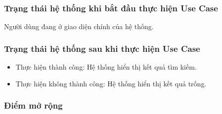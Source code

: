 \subsubsection{Trạng thái hệ thống khi bắt đầu thực hiện Use Case}
Người dùng đang ở giao diện chính của hệ thống.

\subsubsection{Trạng thái hệ thống sau khi thực hiện Use Case}
\begin{itemize}
  \item Thực hiện thành công: Hệ thống hiển thị kết quả tìm kiếm.
  \item Thực hiện không thành công: Hệ thống hiển thị kết quả trống.
\end{itemize}

\subsubsection{Điểm mở rộng}